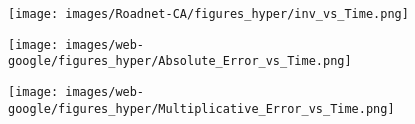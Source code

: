 \begin{figure*}[htbp]
\begin{subfigure}[b]{\textwidth}
\begin{minipage}[b]{0.3\textwidth}
			\texttt{[image: images/Roadnet-CA/figures\_hyper/inv\_vs\_Time.png]} %
		\end{minipage}
	\end{subfigure}
	\begin{subfigure}[b]{\textwidth}
		\centering
		\begin{minipage}[b]{0.05\textwidth}
			\centering
		\end{minipage}%
		\begin{minipage}[b]{0.3\textwidth}
			\centering
			\texttt{[image: images/web-google/figures\_hyper/Absolute\_Error\_vs\_Time.png]} %
			
		\end{minipage}%
		\begin{minipage}[b]{0.3\textwidth}
			\centering
			
			\texttt{[image: images/web-google/figures\_hyper/Multiplicative\_Error\_vs\_Time.png]} %
			
		\end{minipage}%
		\begin{minipage}[b]{0.3\textwidth}
			\centering
			

\end{minipage}
\end{subfigure}
\end{figure*}

